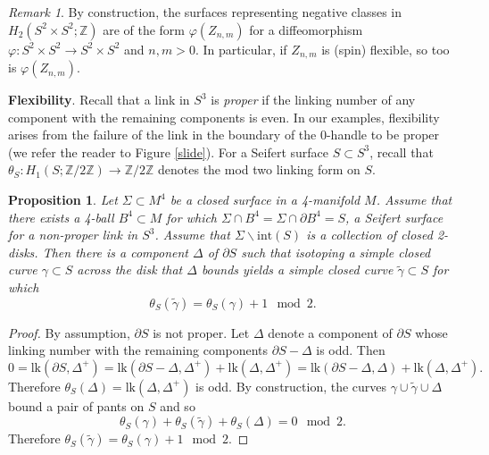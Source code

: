 \documentclass[10pt]{amsart}
\numberwithin{equation}{section}
\theoremstyle{plain}
\newtheorem{proposition}[theorem]{Proposition}
\theoremstyle{definition}
\theoremstyle{remark}
\newtheorem{rmk}[theorem]{Remark}
\begin{document}
\begin{rmk} \label{orbitsurface}
By construction, the surfaces representing negative classes in $H_2(S^2\times S^2;\mathbb{Z})$ are of the form $\varphi(Z_{n,m})$ for a diffeomorphism $\varphi : S^2 \times S^2 \to S^2 \times S^2$ and $n,m >0$. In particular, if $Z_{n,m}$ is (spin) flexible, so too is $\varphi(Z_{n,m})$. 
\end{rmk}




\textbf{Flexibility}. Recall that a link in $S^3$ is \textit{proper} if the linking number of any component  with the remaining components is even. In our examples, flexibility arises from the failure of the link in the boundary of the 0-handle to be proper (we refer the reader to Figure \ref{slide}). For a Seifert surface $S \subset S^3$, recall that $\theta_S : H_1(S;\mathbb{Z}/2\mathbb{Z}) \to \mathbb{Z}/2\mathbb{Z}$ denotes the mod two linking form on $S$.  

\begin{proposition} \label{geometricwitness}
Let $\Sigma \subset M^4$ be a closed surface in a 4-manifold $M$. Assume that there exists a 4-ball $B^4 \subset M$ for which $\Sigma \cap B^4 = \Sigma \cap \partial B^4 = S$, a Seifert surface for a non-proper link in $S^3$. Assume that $\Sigma \backslash \textrm{int}(S)$ is a collection of closed 2-disks. Then there is a component $\Delta$ of $\partial S$ such that isotoping a simple closed curve $\gamma \subset S$ across the disk that $\Delta$ bounds yields a simple closed curve $\widetilde{\gamma} \subset S$ for which \[\theta_{S}(\widetilde{\gamma}) = \theta_S(\gamma) +1 \mod 2. \]
\end{proposition}

\begin{proof}
By assumption, $\partial S$ is not proper. Let $\Delta$ denote a component of $\partial S$ whose linking number with the remaining components $\partial S -\Delta$ is odd. Then 
\[ 0 = \mathrm{lk}(\partial S,\Delta^+) = \mathrm{lk}(\partial S-\Delta,\Delta^+) + \mathrm{lk}(\Delta,\Delta^+) = \mathrm{lk}(\partial S-\Delta,\Delta) + \mathrm{lk}(\Delta,\Delta^+).\]
Therefore $\theta_S(\Delta) = \mathrm{lk}(\Delta,\Delta^+)$ is odd. By construction, the curves $\gamma \cup \widetilde{\gamma} \cup \Delta$ bound a pair of pants on $S$ and so 
\[ \theta_S(\gamma) + \theta_S(\widetilde{\gamma}) + \theta_S(\Delta) = 0 \mod 2.\]
Therefore $\theta_{S}(\widetilde{\gamma}) = \theta_S(\gamma) +1 \mod 2.$
\end{proof}
\end{document}
